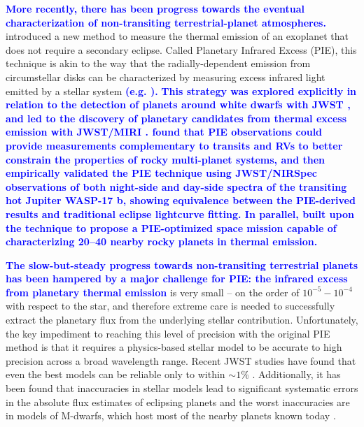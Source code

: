 \documentclass[twocolumn,linenumbers]{aastex7}
\newcommand{\update}[1]{\textcolor{blue}{\bf #1}}
\begin{document}
\update{
    More recently, there has been progress towards the eventual characterization of non-transiting terrestrial-planet atmospheres.
} \citet{stevenson2020} introduced a new method to measure the thermal emission of an exoplanet that does not require a secondary eclipse. Called Planetary Infrared Excess (PIE), this technique is akin to the way that the radially-dependent emission from circumstellar disks can be characterized by measuring excess infrared light emitted by a stellar system \update{ (e.g. \citet{meyer2008}).}
\update{
    This strategy was explored explicitly in relation to the detection of planets around white dwarfs with JWST \citep{limbach2022}, and led to the discovery of planetary candidates from thermal excess emission with JWST/MIRI \citep{limbach2024,limbach2025}. \citet{mayorga2023} found that PIE observations could provide measurements complementary to transits and RVs to better constrain the properties of rocky multi-planet systems, and \citet{lustig-yaeger2025} then empirically validated the PIE technique using JWST/NIRSpec observations of both night-side and day-side spectra of the transiting hot Jupiter WASP-17 b, showing equivalence between the PIE-derived results and traditional eclipse lightcurve fitting. In parallel, \citet{mandell2022} built upon the technique to propose a PIE-optimized space mission capable of characterizing 20--40 nearby rocky planets in thermal emission.
}

\update{The slow-but-steady progress towards non-transiting terrestrial planets has been hampered by a major challenge for PIE: the infrared excess from planetary thermal emission} is very small -- on the order of $10^{-5} - 10^{-4}$ with respect to the star, and therefore extreme care is needed to successfully extract the planetary flux from the underlying stellar contribution. Unfortunately, the key impediment to reaching this level of precision with the original PIE method is that it requires a physics-based stellar model to be accurate to high precision across a broad wavelength range. Recent JWST studies have found that even the best models can be reliable only to within $\sim 1\%$ \citep{moran2023}. Additionally, it has been found that inaccuracies in stellar models lead to significant systematic errors in the absolute flux estimates of eclipsing planets and the worst inaccuracies are in models of M-dwarfs, which host most of the nearby planets known today \citep{fauchez2025}.
\end{document}
